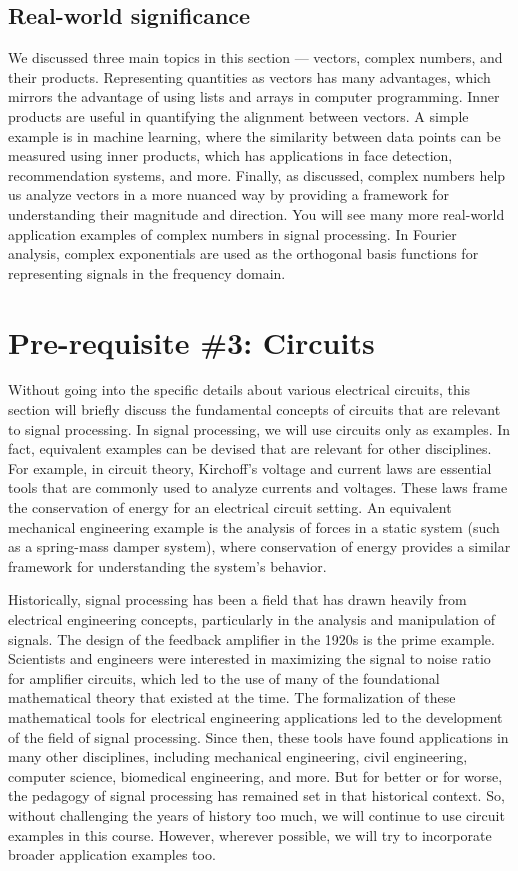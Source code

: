 \documentclass{ee102_notes}
\begin{document}
\subsection{Real-world significance}
We discussed three main topics in this section --- vectors, complex numbers, and their products.
Representing quantities as vectors has many advantages, which mirrors the advantage of using lists and arrays in computer programming. Inner products are useful in quantifying the alignment between vectors. A simple example is in machine learning, where the similarity between data points can be measured using inner products, which has applications in face detection, recommendation systems, and more. Finally, as discussed, complex numbers help us analyze vectors in a more nuanced way by providing a framework for understanding their magnitude and direction. You will see many more real-world application examples of complex numbers in signal processing. In Fourier analysis, complex exponentials are used as the orthogonal basis functions for representing signals in the frequency domain.

\section{Pre-requisite \#3: Circuits}
Without going into the specific details about various electrical circuits, this section will briefly discuss the fundamental concepts of circuits that are relevant to signal processing. In signal processing, we will use circuits only as examples. In fact, equivalent examples can be devised that are relevant for other disciplines. For example, in circuit theory, Kirchoff's voltage and current laws are essential tools that are commonly used to analyze currents and voltages. These laws frame the conservation of energy for an electrical circuit setting. An equivalent mechanical engineering example is the analysis of forces in a static system (such as a spring-mass damper system), where conservation of energy provides a similar framework for understanding the system's behavior. 

Historically, signal processing has been a field that has drawn heavily from electrical engineering concepts, particularly in the analysis and manipulation of signals. The design of the feedback amplifier in the 1920s is the prime example. Scientists and engineers were interested in maximizing the signal to noise ratio for amplifier circuits, which led to the use of many of the foundational mathematical theory that existed at the time. The formalization of these mathematical tools for electrical engineering applications led to the development of the field of signal processing. Since then, these tools have found applications in many other disciplines, including mechanical engineering, civil engineering, computer science, biomedical engineering, and more. But for better or for worse, the pedagogy of signal processing has remained set in that historical context. So, without challenging the years of history too much, we will continue to use circuit examples in this course. However, wherever possible, we will try to incorporate broader application examples too. 
\end{document}

